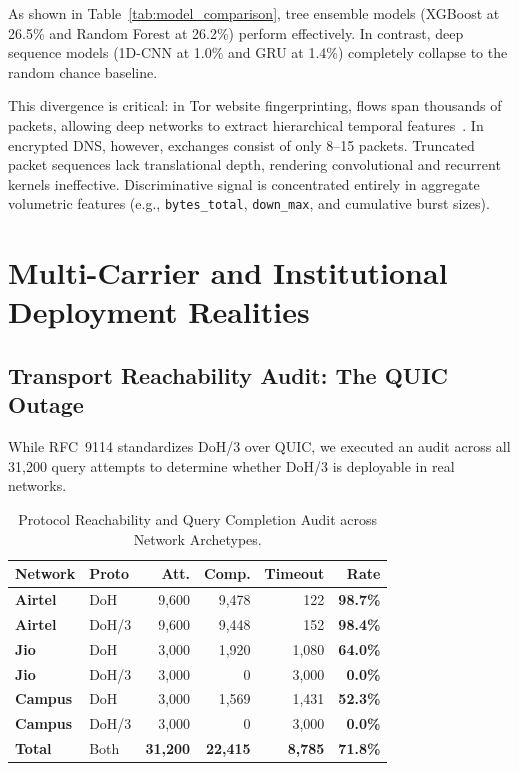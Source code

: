 \documentclass[conference,10pt]{IEEEtran}
\begin{document}
As shown in Table~\ref{tab:model_comparison}, tree ensemble models (XGBoost at 26.5\% and Random Forest at 26.2\%) perform effectively. In contrast, deep sequence models (1D-CNN at 1.0\% and GRU at 1.4\%) completely collapse to the random chance baseline. 

This divergence is critical: in Tor website fingerprinting, flows span thousands of packets, allowing deep networks to extract hierarchical temporal features~\cite{sirinam2018deep}. In encrypted DNS, however, exchanges consist of only 8--15 packets. Truncated packet sequences lack translational depth, rendering convolutional and recurrent kernels ineffective. Discriminative signal is concentrated entirely in aggregate volumetric features (e.g., \texttt{bytes\_total}, \texttt{down\_max}, and cumulative burst sizes).

\section{Multi-Carrier and Institutional Deployment Realities}
\label{sec:multicarrier}

\subsection{Transport Reachability Audit: The QUIC Outage}
While RFC~9114 standardizes DoH/3 over QUIC, we executed an audit across all 31,200 query attempts to determine whether DoH/3 is deployable in real networks.

\begin{table}[t]
\centering
\caption{Protocol Reachability and Query Completion Audit across Network Archetypes.}
\label{tab:reachability_audit}
\footnotesize
\setlength{\tabcolsep}{2.5pt}
\begin{tabular}{llrrrr}
\toprule
\textbf{Network} & \textbf{Proto} & \textbf{Att.} & \textbf{Comp.} & \textbf{Timeout} & \textbf{Rate} \\
\midrule
\textbf{Airtel} & DoH   & 9,600  & 9,478 & 122   & \textbf{98.7\%} \\
\textbf{Airtel} & DoH/3 & 9,600  & 9,448 & 152   & \textbf{98.4\%} \\
\midrule
\textbf{Jio}    & DoH   & 3,000  & 1,920 & 1,080 & \textbf{64.0\%} \\
\textbf{Jio}    & DoH/3 & 3,000  & 0     & 3,000 & \textbf{0.0\%} \\
\midrule
\textbf{Campus} & DoH   & 3,000  & 1,569 & 1,431 & \textbf{52.3\%} \\
\textbf{Campus} & DoH/3 & 3,000  & 0     & 3,000 & \textbf{0.0\%} \\
\midrule
\textbf{Total}  & Both  & \textbf{31,200} & \textbf{22,415} & \textbf{8,785} & \textbf{71.8\%} \\
\bottomrule
\end{tabular}
\end{table}
\end{document}
